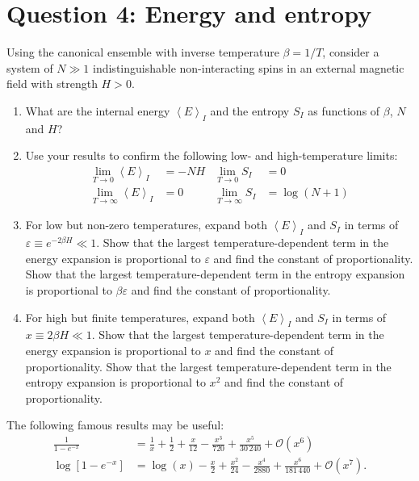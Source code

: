\documentclass[12 pt]{article} %
\newcommand{\cO}{\ensuremath{\mathcal O} }
\newcommand{\be}{\ensuremath{\beta} }
\newcommand{\eps}{\ensuremath{\varepsilon} }
\newcommand{\vev}[1]{\ensuremath{\left\langle #1 \right\rangle} }
\newcommand{\showmarks}[1]{\rightline{\texttt{[#1 marks]}}} %
\begin{document}
\newpage
\section*{Question 4: Energy and entropy} %
Using the canonical ensemble with inverse temperature $\be = 1 / T$, consider a system of $N \gg 1$ indistinguishable non-interacting spins in an external magnetic field with strength $H > 0$.

\begin{enumerate}[label={(\alph*)}]
  \item What are the internal energy $\vev{E}_I$ and the entropy $S_I$ as functions of $\be$, $N$ and $H$?

  \showmarks{4}

  \item Use your results to confirm the following low- and high-temperature limits:
        \begin{align*}
               \lim_{T \to 0} \vev{E}_I & = -NH &      \lim_{T \to 0} S_I & = 0           \\
          \lim_{T \to \infty} \vev{E}_I & = 0   & \lim_{T \to \infty} S_I & = \log(N + 1)
        \end{align*}

  \showmarks{6}

  \item For low but non-zero temperatures, expand both $\vev{E}_I$ and $S_I$ in terms of $\eps \equiv e^{-2\be H} \ll 1$.
        Show that the largest temperature-dependent term in the energy expansion is proportional to $\eps$ and find the constant of proportionality.
        Show that the largest temperature-dependent term in the entropy expansion is proportional to $\be\eps$ and find the constant of proportionality.

  \showmarks{8}

  \item For high but finite temperatures, expand both $\vev{E}_I$ and $S_I$ in terms of $x \equiv 2\be H \ll 1$.
        Show that the largest temperature-dependent term in the energy expansion is proportional to $x$ and find the constant of proportionality.
        Show that the largest temperature-dependent term in the entropy expansion is proportional to $x^2$ and find the constant of proportionality.

  \showmarks{8}
\end{enumerate}

\noindent The following famous results may be useful:
\begin{align*}
  \frac{1}{1 - e^{-x}} & = \frac{1}{x} + \frac{1}{2} + \frac{x}{12} - \frac{x^3}{720} + \frac{x^5}{30\,240} + \cO\!\left(x^6\right) \\
  \log\left[1 - e^{-x}\right] & = \log(x) - \frac{x}{2} + \frac{x^2}{24} - \frac{x^4}{2880} + \frac{x^6}{181\,440} + \cO\!\left(x^7\right).
\end{align*}



\end{document}
